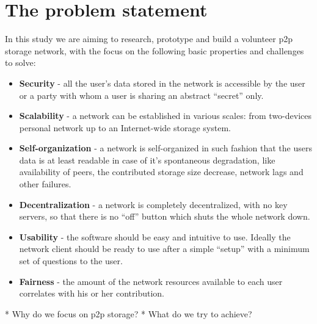 \section{The problem statement}

In this study we are aiming to research, prototype and build a volunteer
p2p storage network, with the focus on the following basic properties
and challenges to solve:

\begin{itemize}
\item \textbf{Security} - all the user's data stored in the network is
  accessible by the user or a party with whom a user is sharing an abstract
  ``secret'' only.
\item \textbf{Scalability} - a network can be established in various
  scales: from two-devices personal network up to an Internet-wide storage
  system.
\item \textbf{Self-organization} - a network is self-organized in such
  fashion that the users data is at least readable in case of it's spontaneous
  degradation, like availability of peers, the contributed storage size
  decrease, network lags and other failures.
\item \textbf{Decentralization} - a network is completely decentralized,
  with no key servers, so that there is no ``off'' button which shuts the
  whole network down.
\item \textbf{Usability} - the software should be easy and intuitive to
  use. Ideally the network client should be ready to use after a  simple
  ``setup'' with a minimum set of questions to the user.
\item \textbf{Fairness} - the amount of the network resources available
  to each user correlates with his or her contribution.
\end{itemize}


* Why do we focus on p2p storage?
* What do we try to achieve?

